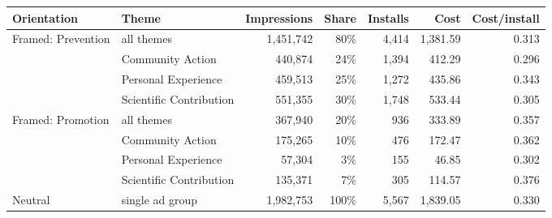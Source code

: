 \begin{tabular}{llrrrrr}
\toprule
Orientation & Theme & Impressions & Share & Installs & Cost & Cost/install \\
\midrule
Framed: Prevention & all themes & 1,451,742 & 80\% & 4,414 & 1,381.59 & 0.313 \\
 & \quad Community Action & 440,874 & 24\% & 1,394 & 412.29 & 0.296 \\
 & \quad Personal Experience & 459,513 & 25\% & 1,272 & 435.86 & 0.343 \\
 & \quad Scientific Contribution & 551,355 & 30\% & 1,748 & 533.44 & 0.305 \\
Framed: Promotion & all themes & 367,940 & 20\% & 936 & 333.89 & 0.357 \\
 & \quad Community Action & 175,265 & 10\% & 476 & 172.47 & 0.362 \\
 & \quad Personal Experience & 57,304 & 3\% & 155 & 46.85 & 0.302 \\
 & \quad Scientific Contribution & 135,371 & 7\% & 305 & 114.57 & 0.376 \\
Neutral & single ad group & 1,982,753 & 100\% & 5,567 & 1,839.05 & 0.330 \\
\bottomrule
\end{tabular}
